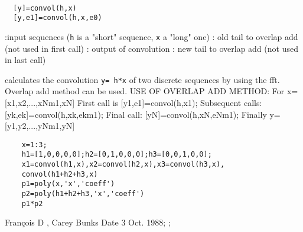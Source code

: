 
\begin{mandesc}
   \\ %
\end{mandesc}
\begin{calling_sequence}
\begin{verbatim}
  [y]=convol(h,x)  
  [y,e1]=convol(h,x,e0)  
\end{verbatim}
\end{calling_sequence}
\begin{parameters}
  \begin{varlist}
    :input sequences (\verb!h! is a "short" sequence, 
    \verb!x! a "long" one)
    : old tail to overlap add (not used in first call)
    : output of convolution
    : new tail to overlap add (not used in last call)
  \end{varlist}
\end{parameters}
\begin{mandescription}
  calculates the convolution \verb!y= h*x! of two
  discrete sequences by using the fft.  Overlap add method can be used.
  USE OF OVERLAP ADD METHOD: 
  For x=[x1,x2,...,xNm1,xN]
  First call is [y1,e1]=convol(h,x1); 
  Subsequent calls: [yk,ek]=convol(h,xk,ekm1);
  Final call: [yN]=convol(h,xN,eNm1);
  Finally y=[y1,y2,...,yNm1,yN]
\end{mandescription}
\begin{examples}
  \begin{Verbatim}
    x=1:3;
    h1=[1,0,0,0,0];h2=[0,1,0,0,0];h3=[0,0,1,0,0];
    x1=convol(h1,x),x2=convol(h2,x),x3=convol(h3,x),
    convol(h1+h2+h3,x)
    p1=poly(x,'x','coeff')
    p2=poly(h1+h2+h3,'x','coeff')
    p1*p2
  \end{Verbatim}
\end{examples}
\begin{manseealso}
      
\end{manseealso}
\begin{authors}
  Fran\c{c}ois D , Carey Bunks Date 3 Oct. 1988; ;   
\end{authors}
